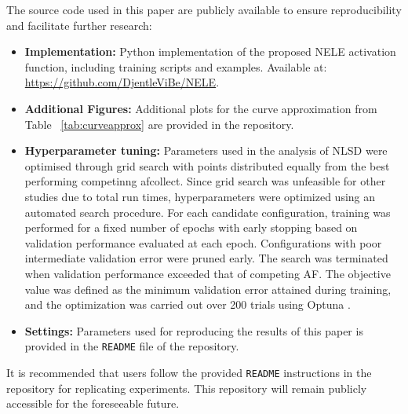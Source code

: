 \documentclass{article}
\begin{document}
The source code used in this paper are publicly available to ensure reproducibility and facilitate further research:

\begin{itemize}
    \item \textbf{Implementation:} Python implementation of the proposed NELE activation function, including training scripts and examples. Available at: 
    \url{https://github.com/DjentleViBe/NELE}.
    
    \item \textbf{Additional Figures:} Additional plots for the curve approximation from Table ~\ref{tab:curveapprox} are provided in the repository.
    \item \textbf{Hyperparameter tuning: }Parameters used in the analysis of NLSD were optimised through grid search with points 
    distributed equally from the best performing competinng afcollect. Since grid search was unfeasible for other studies due to total run times, 
    hyperparameters were optimized using an automated search procedure. 
    For each candidate configuration, training was performed for a fixed number of epochs 
    with early stopping based on validation performance evaluated at each epoch. 
    Configurations with poor intermediate validation error were pruned early. 
    The search was terminated 
    when validation performance exceeded that of competing AF. 
    The objective value was defined as the minimum validation error attained 
    during training, and the optimization was carried out over 200 trials using 
    Optuna \cite{optuna_2019}.
    \item \textbf{Settings:} Parameters used for reproducing the results of this paper is provided in the
    \texttt{README} file of the repository.
  
\end{itemize}

It is recommended that users follow the provided \texttt{README} instructions in the repository for replicating experiments. 
This repository will remain publicly accessible for the foreseeable future.
\end{document}
